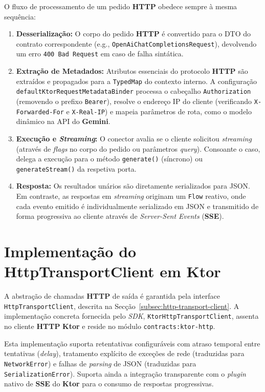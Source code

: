     O fluxo de processamento de um pedido \textbf{HTTP} obedece sempre à mesma sequência:
    \begin{enumerate}
        \item \textbf{Desserialização:} O corpo do pedido \textbf{HTTP} é convertido para o DTO do contrato correspondente (e.g., \texttt{OpenAiChatCompletionsRequest}), devolvendo um erro \texttt{400 Bad Request} em caso de falha sintática.
        \item \textbf{Extração de Metadados:} Atributos essenciais do protocolo \textbf{HTTP} são extraídos e propagados para a \texttt{TypedMap} do contexto interno. A configuração \texttt{default\allowbreak Ktor\allowbreak Request\allowbreak Metadata\allowbreak Binder} processa o cabeçalho \texttt{Authorization} (removendo o prefixo \texttt{Bearer}), resolve o endereço IP do cliente (verificando \texttt{X-Forwarded-For} e \texttt{X-Real-IP}) e mapeia parâmetros de rota, como o modelo dinâmico na API do \textbf{Gemini}.
        \item \textbf{Execução e \textit{Streaming}:} O conector avalia se o cliente solicitou \textit{streaming} (através de \textit{flags} no corpo do pedido ou parâmetros \textit{query}). Consoante o caso, delega a execução para o método \texttt{generate()} (síncrono) ou \texttt{generateStream()} da respetiva porta.
       \item \textbf{Resposta:} Os resultados unários são diretamente serializados para JSON. Em contraste, as respostas em \textit{streaming} originam um \texttt{Flow} reativo, onde cada evento emitido é individualmente serializado em JSON e transmitido de forma progressiva ao cliente através de \textit{Server-Sent Events} (\textbf{SSE}).
    \end{enumerate}

    \section{Implementação do HttpTransportClient em \textbf{Ktor}}
    \label{sec:ktor-transport-impl}

    A abstração de chamadas \textbf{HTTP} de saída é garantida pela interface \texttt{HttpTransportClient}, descrita na Secção~\ref{subsec:http-transport-client}. A implementação concreta fornecida pelo \textit{SDK}, \texttt{KtorHttpTransportClient}, assenta no cliente \textbf{HTTP} \textbf{Ktor} e reside no módulo \texttt{contracts:ktor-http}. 
    
    Esta implementação suporta retentativas configuráveis com atraso temporal entre tentativas (\textit{delay}), tratamento explícito de exceções de rede (traduzidas para \texttt{NetworkError}) e falhas de \textit{parsing} de JSON (traduzidas para \texttt{SerializationError}). Suporta ainda a integração transparente com o \textit{plugin} nativo de \textbf{SSE} do \textbf{Ktor} para o consumo de respostas progressivas.

